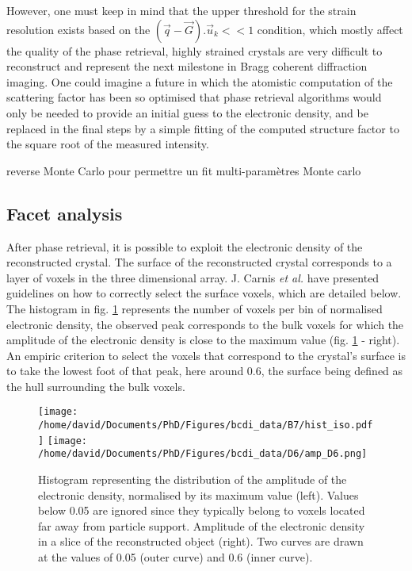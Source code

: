 However, one must keep in mind that the upper threshold for the strain resolution exists based on the $(\vec{q}-\vec{G}).\vec{u}_k<<1$ condition, which mostly affect the quality of the phase retrieval, highly strained crystals are very difficult to reconstruct and represent the next milestone in Bragg coherent diffraction imaging.
One could imagine a future in which the atomistic computation of the scattering factor has been so optimised that phase retrieval algorithms would only be needed to provide an initial guess to the electronic density, and be replaced in the final steps by a simple fitting of the computed structure factor to the square root of the measured intensity.

\textcolor{Important}{reverse Monte Carlo pour permettre un fit multi-paramètres
 Monte carlo \parencite{RLMcGreevy_2001}}

\subsection{Facet analysis} \label{sec:FacetAnalysis}

After phase retrieval, it is possible to exploit the electronic density of the reconstructed crystal.
The surface of the reconstructed crystal corresponds to a layer of voxels in the three dimensional array.
J. Carnis \textit{et al.} \parencite*{Carnis2019_scientific_reports} have presented guidelines on how to correctly select the surface voxels, which are detailed below.
The histogram in fig. \ref{fig:histo} represents the number of voxels per bin of normalised electronic density, the observed peak corresponds to the bulk voxels for which the amplitude of the electronic density is close to the maximum value (fig. \ref{fig:histo} - right).
An empiric criterion to select the voxels that correspond to the crystal's surface is to take the lowest foot of that peak, here around \num{0.6}, the surface being defined as the hull surrounding the bulk voxels.

\begin{figure}[!htb]
   \centering
   \texttt{[image: /home/david/Documents/PhD/Figures/bcdi\_data/B7/hist\_iso.pdf]}
   \texttt{[image: /home/david/Documents/PhD/Figures/bcdi\_data/D6/amp\_D6.png]}
   \caption{
   Histogram representing the distribution of the amplitude of the electronic density, normalised by its maximum value (left).
   Values below 0.05 are ignored since they typically belong to voxels located far away from particle support.
   Amplitude of the electronic density in a slice of the reconstructed object (right).
   Two curves are drawn at the values of \num{0.05} (outer curve) and \num{0.6} (inner curve).
   }
   \label{fig:histo}
\end{figure}

